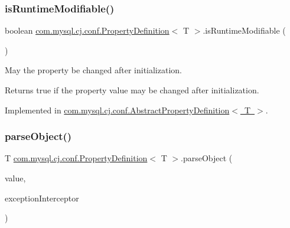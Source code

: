 \mbox{\label{interfacecom_1_1mysql_1_1cj_1_1conf_1_1_property_definition_a72d0e665c12ca2bfa7c2fd6cf7d50656}} 
\subsubsection{\texorpdfstring{is\+Runtime\+Modifiable()}{isRuntimeModifiable()}}
{\footnotesize\ttfamily boolean \mbox{\hyperlink{interfacecom_1_1mysql_1_1cj_1_1conf_1_1_property_definition}{com.\+mysql.\+cj.\+conf.\+Property\+Definition}}$<$ T $>$.is\+Runtime\+Modifiable (\begin{DoxyParamCaption}{ }\end{DoxyParamCaption})}

May the property be changed after initialization.

\begin{DoxyReturn}{Returns}
true if the property value may be changed after initialization. 
\end{DoxyReturn}


Implemented in \mbox{\hyperlink{classcom_1_1mysql_1_1cj_1_1conf_1_1_abstract_property_definition_a6c98140b2db84ccd0ff29ce165ec9ef5}{com.\+mysql.\+cj.\+conf.\+Abstract\+Property\+Definition$<$ T $>$}}.

\mbox{\label{interfacecom_1_1mysql_1_1cj_1_1conf_1_1_property_definition_a6abfb25b6102c876eddc4f10aca5687c}} 
\subsubsection{\texorpdfstring{parse\+Object()}{parseObject()}}
{\footnotesize\ttfamily T \mbox{\hyperlink{interfacecom_1_1mysql_1_1cj_1_1conf_1_1_property_definition}{com.\+mysql.\+cj.\+conf.\+Property\+Definition}}$<$ T $>$.parse\+Object (\begin{DoxyParamCaption}\item[{String}]{value,  }\item[{\mbox{\hyperlink{interfacecom_1_1mysql_1_1cj_1_1exceptions_1_1_exception_interceptor}{Exception\+Interceptor}}}]{exception\+Interceptor }\end{DoxyParamCaption})}

